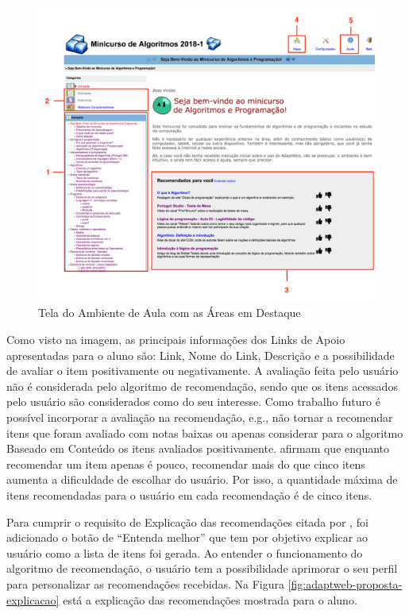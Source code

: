 \begin{figure}[htb]
  \caption{\label{fig:adaptweb-proposta-recomendacao}Tela do Ambiente de Aula com as Áreas em Destaque}
  \begin{center}
      \includegraphics[scale=0.4]{./Figuras/interface-recomendacao.png}
  \end{center}
\end{figure}

Como visto na imagem, as principais informações dos Links de Apoio apresentadas para o aluno são: Link, Nome do Link,
Descrição e a possibilidade de avaliar o item positivamente ou negativamente. A avaliação feita pelo usuário não é
considerada pelo algoritmo de recomendação, sendo que os itens acessados pelo
usuário são considerados como do seu interesse. Como trabalho futuro é possível incorporar a avaliação na recomendação, e.g.,
não tornar a recomendar itens que foram avaliado com notas baixas ou apenas considerar para o algoritmo Baseado em Conteúdo
os itens avaliados positivamente.  afirmam que enquanto recomendar um item apenas é pouco, recomendar mais do que cinco itens
aumenta a dificuldade de escolhar do usuário. Por isso, a quantidade máxima de itens recomendadas para o usuário em cada
recomendação é de cinco itens.

Para cumprir o requisito de Explicação das recomendações citada por , foi adicionado o
botão de ``Entenda melhor'' que tem por objetivo explicar ao usuário como a lista de itens foi gerada. Ao entender o
funcionamento do algoritmo de recomendação, o usuário tem a possibilidade aprimorar o seu perfil para personalizar as
recomendações recebidas. Na Figura \ref{fig:adaptweb-proposta-explicacao} está a explicação das recomendações
mostrada para o aluno.

